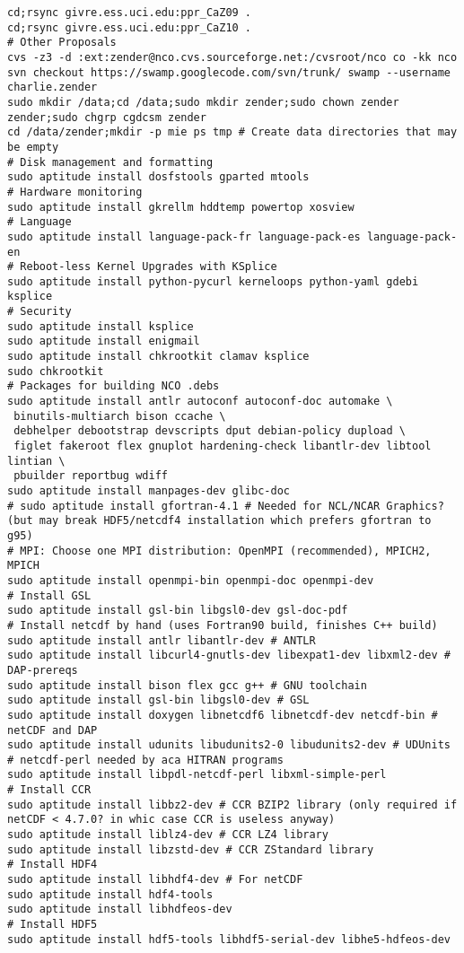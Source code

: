 \documentclass[12pt,twoside]{article}
\begin{document}
\begin{verbatim}
cd;rsync givre.ess.uci.edu:ppr_CaZ09 .
cd;rsync givre.ess.uci.edu:ppr_CaZ10 .
# Other Proposals
cvs -z3 -d :ext:zender@nco.cvs.sourceforge.net:/cvsroot/nco co -kk nco
svn checkout https://swamp.googlecode.com/svn/trunk/ swamp --username charlie.zender
sudo mkdir /data;cd /data;sudo mkdir zender;sudo chown zender zender;sudo chgrp cgdcsm zender
cd /data/zender;mkdir -p mie ps tmp # Create data directories that may be empty
# Disk management and formatting
sudo aptitude install dosfstools gparted mtools 
# Hardware monitoring 
sudo aptitude install gkrellm hddtemp powertop xosview
# Language
sudo aptitude install language-pack-fr language-pack-es language-pack-en
# Reboot-less Kernel Upgrades with KSplice
sudo aptitude install python-pycurl kerneloops python-yaml gdebi ksplice
# Security
sudo aptitude install ksplice
sudo aptitude install enigmail
sudo aptitude install chkrootkit clamav ksplice
sudo chkrootkit
# Packages for building NCO .debs
sudo aptitude install antlr autoconf autoconf-doc automake \
 binutils-multiarch bison ccache \
 debhelper debootstrap devscripts dput debian-policy dupload \
 figlet fakeroot flex gnuplot hardening-check libantlr-dev libtool lintian \
 pbuilder reportbug wdiff
sudo aptitude install manpages-dev glibc-doc
# sudo aptitude install gfortran-4.1 # Needed for NCL/NCAR Graphics? (but may break HDF5/netcdf4 installation which prefers gfortran to g95)
# MPI: Choose one MPI distribution: OpenMPI (recommended), MPICH2, MPICH
sudo aptitude install openmpi-bin openmpi-doc openmpi-dev
# Install GSL
sudo aptitude install gsl-bin libgsl0-dev gsl-doc-pdf
# Install netcdf by hand (uses Fortran90 build, finishes C++ build)
sudo aptitude install antlr libantlr-dev # ANTLR
sudo aptitude install libcurl4-gnutls-dev libexpat1-dev libxml2-dev # DAP-prereqs
sudo aptitude install bison flex gcc g++ # GNU toolchain
sudo aptitude install gsl-bin libgsl0-dev # GSL
sudo aptitude install doxygen libnetcdf6 libnetcdf-dev netcdf-bin # netCDF and DAP
sudo aptitude install udunits libudunits2-0 libudunits2-dev # UDUnits
# netcdf-perl needed by aca HITRAN programs
sudo aptitude install libpdl-netcdf-perl libxml-simple-perl
# Install CCR
sudo aptitude install libbz2-dev # CCR BZIP2 library (only required if netCDF < 4.7.0? in whic case CCR is useless anyway)
sudo aptitude install liblz4-dev # CCR LZ4 library
sudo aptitude install libzstd-dev # CCR ZStandard library
# Install HDF4
sudo aptitude install libhdf4-dev # For netCDF
sudo aptitude install hdf4-tools 
sudo aptitude install libhdfeos-dev
# Install HDF5
sudo aptitude install hdf5-tools libhdf5-serial-dev libhe5-hdfeos-dev

\end{verbatim}
\end{document}
